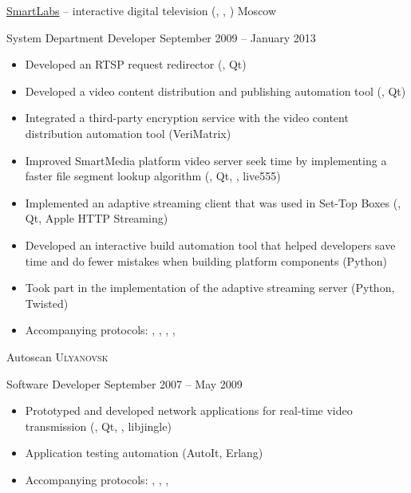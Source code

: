 \documentclass[unicode, 10pt, a4paper, oneside, fleqn]{article}
\begin{document}
\job  %
    {\href{http://www.smartlabs.tv}{SmartLabs} -- interactive digital
           television (, , )}
    {Moscow}
    {
        \position %
            {System Department Developer}
            {September 2009 -- January 2013}
            {
                \begin{itemize}
                    \item{Developed an RTSP request redirector (\CPP, Qt)}
                    \item{Developed a video content distribution and publishing
                          automation tool (\CPP, Qt)}
                    \item{Integrated a third-party encryption service with the
                          video content distribution automation tool (VeriMatrix)}
                    \item{Improved SmartMedia platform video server seek time by
                          implementing a faster file segment lookup algorithm
                          (\CPP, Qt, , live555)}
                    \item{Implemented an adaptive streaming client that was used
                          in Set-Top Boxes (\CPP, Qt, Apple HTTP Streaming)}
                    \item{Developed an interactive build automation tool that
                          helped developers save time and do fewer mistakes when
                          building platform components (Python)}
                    \item{Took part in the implementation of the adaptive
                          streaming server (Python, Twisted)}
                    \item{Accompanying protocols: , ,
                          , , }
                \end{itemize}
            }
    }


\job
    {Autoscan}
    {\textsc{Ulyanovsk}}
    {
        \position
            {Software Developer}
            {September 2007 -- May 2009}
            {
                \begin{itemize}
                    \item{Prototyped and developed network applications for
                          real-time video transmission
                          (\CPP, Qt, , libjingle)}
                    \item{Application testing automation (AutoIt, Erlang)}
                    \item{Accompanying protocols: , , ,
                          }
                \end{itemize}
            }
    }
\end{document}
